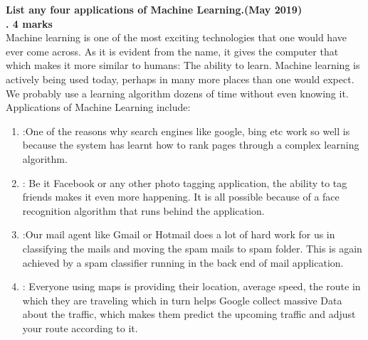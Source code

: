\textbf{\textcolor{LightMagenta}{List any four applications of Machine Learning.(May 2019) \\. \hfill4 marks}} \\[5pt]
Machine learning is one of the most exciting technologies that one would have
ever come across. As it is evident from the name, it gives the computer that which makes it
more similar to humans: The ability to learn. Machine learning is actively being used today,
perhaps in many more places than one would expect. We probably use a learning algorithm
dozens of time without even knowing it. Applications of Machine Learning include:
\begin{enumerate}
\item \textcolor{purple}{\underline{}:}One of the reasons why search engines like google, bing etc work
so well is because the system has learnt how to rank pages through a complex learning
algorithm.
\item \textcolor{purple}{\underline{}:} Be it Facebook or any other photo tagging application,
the ability to tag friends makes it even more happening. It is all possible because of a face
recognition algorithm that runs behind the application.
\item \textcolor{purple}{\underline{}:}Our mail agent like Gmail or Hotmail does a lot of hard work for us
in classifying the mails and moving the spam mails to spam folder. This is again achieved
by a spam classifier running in the back end of mail application.
\item \textcolor{purple}{\underline{}:} Everyone using maps is providing their location, average speed,
the route in which they are traveling which in turn helps Google collect massive Data about
the traffic, which makes them predict the upcoming traffic and adjust your route according
to it.
\end{enumerate}